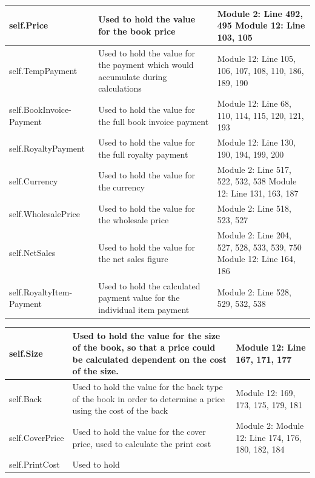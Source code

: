 \begin{center}
\begin{tabular}{|p{3cm}|p{4cm}|p{3cm}|}
    \hline
    self.Price & Used to hold the value for the book price & Module 2: Line 492, 495 \newline Module 12: Line 103, 105 \\ \hline
    self.TempPayment & Used to hold the value for the payment which would accumulate during calculations & Module 12: Line 105, 106, 107, 108, 110, 186, 189, 190 \\ \hline
    self.BookInvoice-Payment & Used to hold the value for the full book invoice payment & Module 12: Line 68, 110, 114, 115, 120, 121, 193 \\ \hline
    self.RoyaltyPayment & Used to hold the value for the full royalty payment & Module 12: Line 130, 190, 194, 199, 200 \\ \hline
    self.Currency & Used to hold the value for the currency & Module 2: Line 517, 522, 532, 538 \newline Module 12: Line 131, 163, 187 \\ \hline
    self.WholesalePrice & Used to hold the value for the wholesale price & Module 2: Line 518, 523, 527 \\ \hline
    self.NetSales & Used to hold the value for the net sales figure & Module 2: Line 204, 527, 528, 533, 539, 750 \newline Module 12: Line 164, 186 \\ \hline
    self.RoyaltyItem-Payment & Used to hold the calculated payment value for the individual item payment & Module 2: Line 528, 529, 532, 538 \\ \hline
    \hline     
\end{tabular}
\end{center}

\begin{center}
\begin{tabular}{|p{3cm}|p{4cm}|p{3cm}|}
    \hline
    self.Size & Used to hold the value for the size of the book, so that a price could be calculated dependent on the cost of the size. & Module 12: Line 167, 171, 177 \\  \hline
    self.Back & Used to hold the value for the back type of the book in order to determine a price using the cost of the back & Module 12: 169, 173, 175, 179, 181 \\ \hline
    self.CoverPrice & Used to hold the value for the cover price, used to calculate the print cost & Module 2: Module 12: Line 174, 176, 180, 182, 184 \\ \hline
    self.PrintCost & Used to hold 
    \hline     
\end{tabular}
\end{center}

